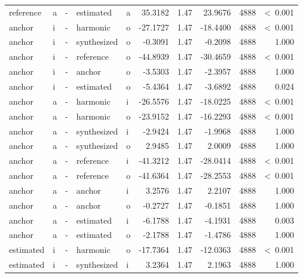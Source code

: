\documentclass[a4paper,man,hidelinks,floatsintext]{apa7}
\begin{document}
\begin{table}[!htbp]
\begin{adjustbox}{max size={\columnwidth}{\textheight}}
\begin{tabular}{llrllrrrrr}
reference   & a     & - & estimated   & a     &    35.3182 & 1.47 &  23.9676 & 4888 &  \textless~0.001 \\
anchor      & i     & - & harmonic    & o     &   -27.1727 & 1.47 & -18.4400 & 4888 &  \textless~0.001 \\
anchor      & i     & - & synthesized & o     &    -0.3091 & 1.47 &  -0.2098 & 4888 &            1.000 \\
anchor      & i     & - & reference   & o     &   -44.8939 & 1.47 & -30.4659 & 4888 &  \textless~0.001 \\
anchor      & i     & - & anchor      & o     &    -3.5303 & 1.47 &  -2.3957 & 4888 &            1.000 \\
anchor      & i     & - & estimated   & o     &    -5.4364 & 1.47 &  -3.6892 & 4888 &            0.024 \\
anchor      & a     & - & harmonic    & i     &   -26.5576 & 1.47 & -18.0225 & 4888 &  \textless~0.001 \\
anchor      & a     & - & harmonic    & o     &   -23.9152 & 1.47 & -16.2293 & 4888 &  \textless~0.001 \\
anchor      & a     & - & synthesized & i     &    -2.9424 & 1.47 &  -1.9968 & 4888 &            1.000 \\
anchor      & a     & - & synthesized & o     &     2.9485 & 1.47 &   2.0009 & 4888 &            1.000 \\
anchor      & a     & - & reference   & i     &   -41.3212 & 1.47 & -28.0414 & 4888 &  \textless~0.001 \\
anchor      & a     & - & reference   & o     &   -41.6364 & 1.47 & -28.2553 & 4888 &  \textless~0.001 \\
anchor      & a     & - & anchor      & i     &     3.2576 & 1.47 &   2.2107 & 4888 &            1.000 \\
anchor      & a     & - & anchor      & o     &    -0.2727 & 1.47 &  -0.1851 & 4888 &            1.000 \\
anchor      & a     & - & estimated   & i     &    -6.1788 & 1.47 &  -4.1931 & 4888 &            0.003 \\
anchor      & a     & - & estimated   & o     &    -2.1788 & 1.47 &  -1.4786 & 4888 &            1.000 \\
estimated   & i     & - & harmonic    & o     &   -17.7364 & 1.47 & -12.0363 & 4888 &  \textless~0.001 \\
estimated   & i     & - & synthesized & i     &     3.2364 & 1.47 &   2.1963 & 4888 &            1.000 \\

\end{tabular}
\end{adjustbox}
\end{table}
\end{document}
